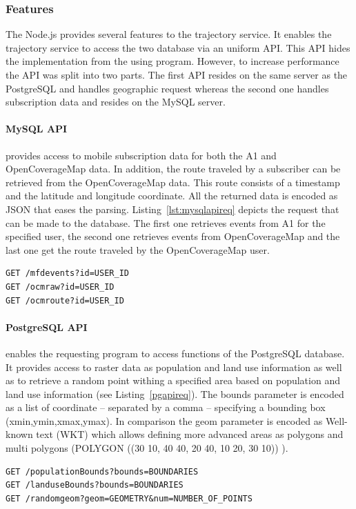 \documentclass[master,english]{hgbthesis}
\begin{document}
\subsubsection{Features}
The Node.js provides several features  to the trajectory service. It enables the trajectory service to access the two database via an uniform API. This API hides the implementation from the using program. However, to increase performance the API was split into two parts. The first API resides on the same server as the PostgreSQL and handles geographic request whereas the second one handles subscription data and resides on the MySQL server.
\paragraph{MySQL API}
provides access to mobile subscription data for both the A1 and OpenCoverageMap data. In addition, the route traveled by a subscriber can be retrieved from the OpenCoverageMap data. This route consists of a timestamp and the latitude and longitude coordinate. All the returned data is encoded as JSON that eases the parsing. Listing~\ref{lst:mysqlapireq} depicts the request that can be made to the database. The first one retrieves events from A1 for the specified user, the second one retrieves events from OpenCoverageMap and the last one get the route traveled by the OpenCoverageMap user.
\begin{lstlisting}[style=BashInputStyle,caption={MySQL API requests},label={lst:mysqlapireq}]
GET /mfdevents?id=USER_ID
GET /ocmraw?id=USER_ID
GET /ocmroute?id=USER_ID
\end{lstlisting}
\paragraph{PostgreSQL API} 
enables the requesting program to access functions of the PostgreSQL database. It provides access to raster data as population and land use information as well as to retrieve a random point withing a specified area based on population and land use information (see Listing~\ref{pgapireq}). The bounds parameter is encoded as a list  of coordinate -- separated by a comma -- specifying a bounding box (xmin,ymin,xmax,ymax). In comparison the geom parameter is encoded as Well-known text (WKT) which allows defining more advanced areas as polygons and multi polygons (POLYGON ((30 10, 40 40, 20 40, 10 20, 30 10))
). 
\begin{lstlisting}[style=BashInputStyle,caption={PostgreSQL API requests},label={lst:pgapireq}]
GET /populationBounds?bounds=BOUNDARIES
GET /landuseBounds?bounds=BOUNDARIES
GET /randomgeom?geom=GEOMETRY&num=NUMBER_OF_POINTS
\end{lstlisting}
\end{document}
